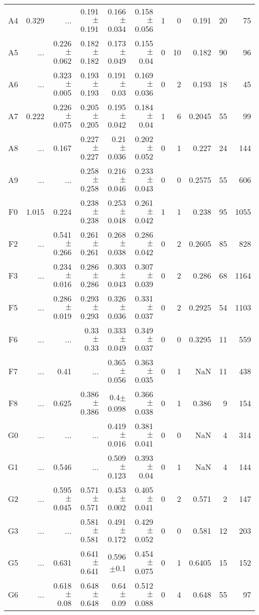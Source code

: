 \begin{table}[t]
\begin{center}
\begin{tabular}{c|rrrrr|rrrrr}
A4	&	0.329	&	 ...	&	0.191$\pm$0.191	&	0.166$\pm$0.034	&	0.158$\pm$0.056	&	1	&	0	&	0.191	&	20	&	75	\\
A5	&	 ...	&	0.226$\pm$0.062	&	0.182$\pm$0.182	&	0.173$\pm$0.049	&	0.155$\pm$0.04	&	0	&	10	&	0.182	&	90	&	96	\\
A6	&	 ...	&	0.323$\pm$0.005	&	0.193$\pm$0.193	&	0.191$\pm$0.03	&	0.169$\pm$0.036	&	0	&	2	&	0.193	&	18	&	45	\\
A7	&	0.222	&	0.226$\pm$0.075	&	0.205$\pm$0.205	&	0.195$\pm$0.042	&	0.184$\pm$0.04	&	1	&	6	&	0.2045	&	55	&	99	\\
A8	&	 ...	&	0.167	&	0.227$\pm$0.227	&	0.21$\pm$0.036	&	0.202$\pm$0.052	&	0	&	1	&	0.227	&	24	&	144	\\
A9	&	 ...	&	 ...	&	0.258$\pm$0.258	&	0.216$\pm$0.046	&	0.233$\pm$0.043	&	0	&	0	&	0.2575	&	55	&	606	\\
F0	&	1.015	&	0.224	&	0.238$\pm$0.238	&	0.253$\pm$0.048	&	0.261$\pm$0.042	&	1	&	1	&	0.238	&	95	&	1055	\\
F2	&	 ...	&	0.541$\pm$0.266	&	0.261$\pm$0.261	&	0.268$\pm$0.038	&	0.286$\pm$0.042	&	0	&	2	&	0.2605	&	85	&	828	\\
F3	&	 ...	&	0.234$\pm$0.016	&	0.286$\pm$0.286	&	0.303$\pm$0.043	&	0.307$\pm$0.039	&	0	&	2	&	0.286	&	68	&	1164	\\
F5	&	 ...	&	0.286$\pm$0.019	&	0.293$\pm$0.293	&	0.326$\pm$0.036	&	0.331$\pm$0.037	&	0	&	2	&	0.2925	&	54	&	1103	\\
F6	&	 ...	&	 ...	&	0.33$\pm$0.33	&	0.333$\pm$0.049	&	0.349$\pm$0.037	&	0	&	0	&	0.3295	&	11	&	559	\\
F7	&	 ...	&	0.41	&	 ...	&	0.365$\pm$0.056	&	0.363$\pm$0.035	&	0	&	1	&	NaN	&	11	&	438	\\
F8	&	 ...	&	0.625	&	0.386$\pm$0.386	&	0.4$\pm$0.098	&	0.366$\pm$0.038	&	0	&	1	&	0.386	&	9	&	154	\\
G0	&	 ...	&	 ...	&	 ...	&	0.419$\pm$0.016	&	0.381$\pm$0.041	&	0	&	0	&	NaN	&	4	&	314	\\
G1	&	 ...	&	0.546	&	 ...	&	0.509$\pm$0.123	&	0.393$\pm$0.04	&	0	&	1	&	NaN	&	4	&	144	\\
G2	&	 ...	&	0.595$\pm$0.045	&	0.571$\pm$0.571	&	0.453$\pm$0.002	&	0.405$\pm$0.041	&	0	&	2	&	0.571	&	2	&	147	\\
G3	&	 ...	&	 ...	&	0.581$\pm$0.581	&	0.491$\pm$0.172	&	0.429$\pm$0.052	&	0	&	0	&	0.581	&	12	&	203	\\
G5	&	 ...	&	0.631	&	0.641$\pm$0.641	&	0.596$\pm$0.1	&	0.454$\pm$0.075	&	0	&	1	&	0.6405	&	15	&	152	\\
G6	&	 ...	&	0.618$\pm$0.08	&	0.648$\pm$0.648	&	0.64$\pm$0.09	&	0.512$\pm$0.088	&	0	&	4	&	0.648	&	55	&	97	\\

\end{tabular}
\end{center}
\end{table}
